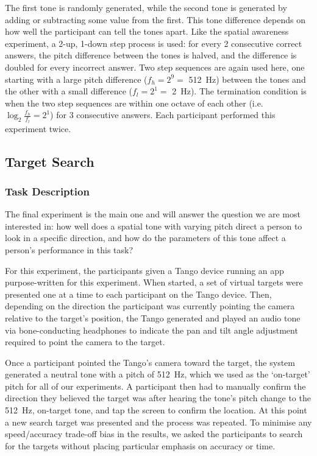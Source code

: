 \documentclass[sigconf, review=true, screen=true, anonymous=true]{acmart}
\begin{document}
The first tone is randomly generated, while the second tone is generated by adding or subtracting some value from the first.
This tone difference depends on how well the participant can tell the tones apart.
Like the spatial awareness experiment, a 2-up, 1-down step process is used: for every 2 consecutive correct answers, the pitch difference between the tones is halved, and the difference is doubled for every incorrect answer.
Two step sequences are again used here, one starting with a large pitch difference ($f_h=2^9=$ \SI{512}{\hertz}) between the tones and the other with a small difference ($f_l=2^1=$ \SI{2}{\hertz}). 
The termination condition is when the two step sequences are within one octave of each other (i.e.\ $\log_2\frac{f_h}{f_l}=2^1$) for 3 consecutive answers.
Each participant performed this experiment twice. 

\subsection{Target Search}

\subsubsection{Task Description}

The final experiment is the main one and will answer the question we are most interested in: how well does a spatial tone with varying pitch direct a person to look in a specific direction, and how do the parameters of this tone affect a person's performance in this task? 

For this experiment, the participants given a Tango device running an app purpose-written for this experiment.
When started, a set of virtual targets were presented one at a time to each participant on the Tango device.
Then, depending on the direction the participant was currently pointing the camera relative to the target's position, the Tango generated and played an audio tone via bone-conducting headphones to indicate the pan and tilt angle adjustment required to point the camera to the target.

Once a participant pointed the Tango's camera toward the target, the system generated a neutral tone with a pitch of \SI{512}{\hertz}, which we used as the `on-target' pitch for all of our experiments.
A participant then had to manually confirm the direction they believed the target was after hearing the tone's pitch change to the \SI{512}{\hertz}, on-target tone, and tap the screen to confirm the location.
At this point a new search target was presented and the process was repeated.
To minimise any speed/accuracy trade-off bias in the results, we asked the participants to search for the targets without placing particular emphasis on accuracy or time. 
\end{document}
